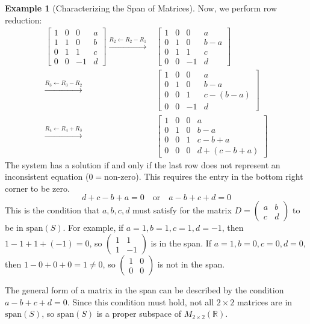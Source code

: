 \documentclass[11pt]{article}
\theoremstyle{definition}
\newtheorem{example}[theorem]{Example}
\newcommand{\R}{\mathbb{R}}
\newcommand{\M}[2]{M_{#1 \times #2}}
\newcommand{\Span}[1]{\text{span}(#1)}
\begin{document}
\begin{example}[Characterizing the Span of Matrices]
Now, we perform row reduction:
\begin{align*} \left[ \begin{array}{ccc|c} 1 & 0 & 0 & a \\ 1 & 1 & 0 & b \\ 0 & 1 & 1 & c \\ 0 & 0 & -1 & d \end{array} \right] \xrightarrow{R_2 \leftarrow R_2 - R_1} &\left[ \begin{array}{ccc|c} 1 & 0 & 0 & a \\ 0 & 1 & 0 & b-a \\ 0 & 1 & 1 & c \\ 0 & 0 & -1 & d \end{array} \right] \\ \xrightarrow{R_3 \leftarrow R_3 - R_2} &\left[ \begin{array}{ccc|c} 1 & 0 & 0 & a \\ 0 & 1 & 0 & b-a \\ 0 & 0 & 1 & c-(b-a) \\ 0 & 0 & -1 & d \end{array} \right] \\ \xrightarrow{R_4 \leftarrow R_4 + R_3} &\left[ \begin{array}{ccc|c} 1 & 0 & 0 & a \\ 0 & 1 & 0 & b-a \\ 0 & 0 & 1 & c-b+a \\ 0 & 0 & 0 & d+(c-b+a) \end{array} \right] \end{align*}
The system has a solution if and only if the last row does not represent an inconsistent equation ($0 = \text{non-zero}$). This requires the entry in the bottom right corner to be zero.
\[ d + c - b + a = 0 \quad \text{or} \quad a - b + c + d = 0 \]
This is the condition that $a, b, c, d$ must satisfy for the matrix $D = \begin{pmatrix} a & b \\ c & d \end{pmatrix}$ to be in $\Span{S}$.
For example, if $a=1, b=1, c=1, d=-1$, then $1-1+1+(-1)=0$, so $\begin{pmatrix} 1 & 1 \\ 1 & -1 \end{pmatrix}$ is in the span. If $a=1, b=0, c=0, d=0$, then $1-0+0+0=1 \neq 0$, so $\begin{pmatrix} 1 & 0 \\ 0 & 0 \end{pmatrix}$ is not in the span.

The general form of a matrix in the span can be described by the condition $a - b + c + d = 0$. Since this condition must hold, not all $2 \times 2$ matrices are in $\Span{S}$, so $\Span{S}$ is a proper subspace of $\M{2}{2}(\R)$.
\end{example}
\end{document}
